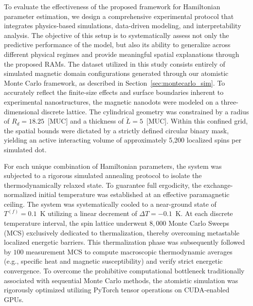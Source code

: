 \documentclass[a4paper,fleqn]{cas-sc}
\begin{document}
To evaluate the effectiveness of the proposed framework 
for Hamiltonian parameter estimation, we design a 
comprehensive experimental protocol that integrates 
physics-based simulations, data-driven modeling, and 
interpretability analysis. The objective of this setup 
is to systematically assess not only the predictive 
performance of the model, but also its ability to 
generalize across different physical regimes and provide 
meaningful spatial explanations through the proposed RAMs. 
The dataset utilized in this study consists entirely of 
simulated magnetic domain configurations generated through 
our atomistic Monte Carlo framework, as described in 
Section~\ref{sec:montecarlo_sim}. To accurately reflect 
the finite-size effects and surface boundaries inherent 
to experimental nanostructures, the magnetic nanodots 
were modeled on a three-dimensional discrete lattice. 
The cylindrical geometry was constrained by a radius of 
$R_d = 18.25$~[MUC] and a thickness of $\breve{L} = 5$~[MUC]. 
Within this confined grid, the spatial bounds were 
dictated by a strictly defined circular binary mask, 
yielding an active interacting volume of approximately 
5,200 localized spins per simulated dot.

For each unique combination of Hamiltonian parameters, 
the system was subjected to a rigorous simulated annealing 
protocol to isolate the thermodynamically relaxed state. 
To guarantee full ergodicity, the exchange-normalized 
initial temperature was established at an effective 
paramagnetic ceiling. The system was systematically 
cooled to a near-ground state of $T^{(f)} = 0.1$~K 
utilizing a linear decrement of $\Delta T = -0.1$~K. 
At each discrete temperature interval, the spin lattice 
underwent $8{,}000$ Monte Carlo Sweeps (MCS) exclusively 
dedicated to thermalization, thereby overcoming metastable 
localized energetic barriers. This thermalization phase 
was subsequently followed by $100$ measurement MCS to 
compute macroscopic thermodynamic averages (e.g., specific 
heat and magnetic susceptibility) and verify strict 
energetic convergence. To overcome the prohibitive 
computational bottleneck traditionally associated with 
sequential Monte Carlo methods, the atomistic simulation 
was rigorously optimized utilizing PyTorch tensor 
operations on CUDA-enabled GPUs.
\end{document}
